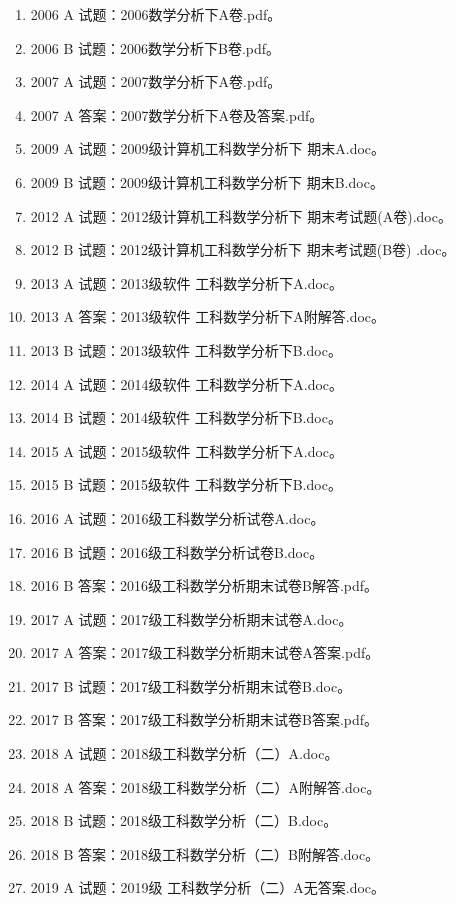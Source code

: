 \begin{enumerate}
  \item 2006 A 试题：2006数学分析下A卷.pdf。
  \item 2006 B 试题：2006数学分析下B卷.pdf。
  \item 2007 A 试题：2007数学分析下A卷.pdf。
  \item 2007 A 答案：2007数学分析下A卷及答案.pdf。
  \item 2009 A 试题：2009级计算机工科数学分析下 期末A.doc。
  \item 2009 B 试题：2009级计算机工科数学分析下 期末B.doc。
  \item 2012 A 试题：2012级计算机工科数学分析下 期末考试题(A卷).doc。
  \item 2012 B 试题：2012级计算机工科数学分析下 期末考试题(B卷) .doc。
  \item 2013 A 试题：2013级软件 工科数学分析下A.doc。
  \item 2013 A 答案：2013级软件 工科数学分析下A附解答.doc。
  \item 2013 B 试题：2013级软件 工科数学分析下B.doc。
  \item 2014 A 试题：2014级软件 工科数学分析下A.doc。
  \item 2014 B 试题：2014级软件 工科数学分析下B.doc。
  \item 2015 A 试题：2015级软件 工科数学分析下A.doc。
  \item 2015 B 试题：2015级软件 工科数学分析下B.doc。
  \item 2016 A 试题：2016级工科数学分析试卷A.doc。
  \item 2016 B 试题：2016级工科数学分析试卷B.doc。
  \item 2016 B 答案：2016级工科数学分析期末试卷B解答.pdf。
  \item 2017 A 试题：2017级工科数学分析期末试卷A.doc。
  \item 2017 A 答案：2017级工科数学分析期末试卷A答案.pdf。
  \item 2017 B 试题：2017级工科数学分析期末试卷B.doc。
  \item 2017 B 答案：2017级工科数学分析期末试卷B答案.pdf。
  \item 2018 A 试题：2018级工科数学分析（二）A.doc。
  \item 2018 A 答案：2018级工科数学分析（二）A附解答.doc。
  \item 2018 B 试题：2018级工科数学分析（二）B.doc。
  \item 2018 B 答案：2018级工科数学分析（二）B附解答.doc。
  \item 2019 A 试题：2019级 工科数学分析（二）A无答案.doc。

\end{enumerate}
